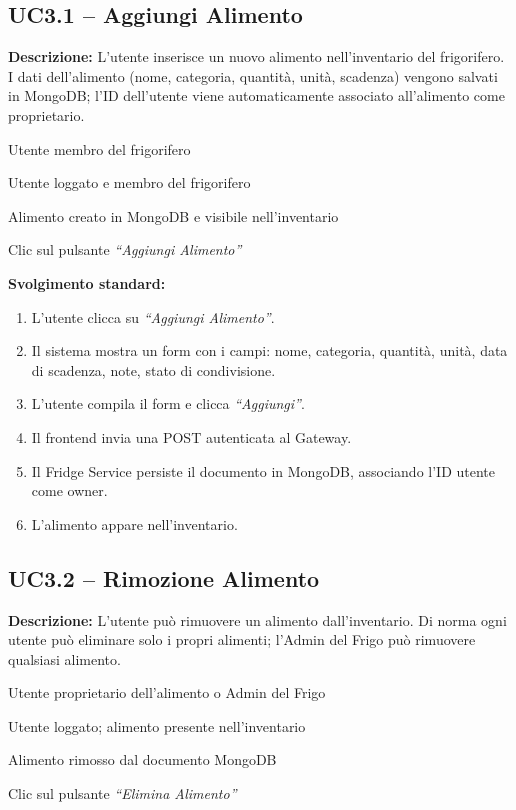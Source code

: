 \documentclass[12pt,a4paper,twoside]{report}
\newenvironment{ucbox}{%
  \begin{mdframed}[
    backgroundcolor=ucbg,
    linecolor=ucborder,
    linewidth=1pt,
    innerleftmargin=10pt,
    innerrightmargin=10pt,
    innertopmargin=8pt,
    innerbottommargin=8pt,
    roundcorner=4pt
  ]
}{%
  \end{mdframed}
}
\begin{document}
\subsection{UC3.1 -- Aggiungi Alimento}

\begin{ucbox}
\textbf{Descrizione:} L'utente inserisce un nuovo alimento nell'inventario del frigorifero. I dati dell'alimento (nome, categoria, quantità, unità, scadenza) vengono salvati in MongoDB; l'ID dell'utente viene automaticamente associato all'alimento come proprietario.

\begin{description}[leftmargin=4cm, style=sameline]
  \item[Attori Coinvolti:] Utente membro del frigorifero
  \item[Precondizione:] Utente loggato e membro del frigorifero
  \item[Postcondizione:] Alimento creato in MongoDB e visibile nell'inventario
  \item[Trigger:] Clic sul pulsante \textit{``Aggiungi Alimento''}
\end{description}
\end{ucbox}

\textbf{Svolgimento standard:}
\begin{enumerate}
  \item L'utente clicca su \textit{``Aggiungi Alimento''}.
  \item Il sistema mostra un form con i campi: nome, categoria, quantità, unità, data di scadenza, note, stato di condivisione.
  \item L'utente compila il form e clicca \textit{``Aggiungi''}.
  \item Il frontend invia una POST autenticata al Gateway.
  \item Il Fridge Service persiste il documento in MongoDB, associando l'ID utente come owner.
  \item L'alimento appare nell'inventario.
\end{enumerate}

\newpage
\subsection{UC3.2 -- Rimozione Alimento}

\begin{ucbox}
\textbf{Descrizione:} L'utente può rimuovere un alimento dall'inventario. Di norma ogni utente può eliminare solo i propri alimenti; l'Admin del Frigo può rimuovere qualsiasi alimento.

\begin{description}[leftmargin=4cm, style=sameline]
  \item[Attori Coinvolti:] Utente proprietario dell'alimento o Admin del Frigo
  \item[Precondizione:] Utente loggato; alimento presente nell'inventario
  \item[Postcondizione:] Alimento rimosso dal documento MongoDB
  \item[Trigger:] Clic sul pulsante \textit{``Elimina Alimento''}
\end{description}
\end{ucbox}
\end{document}
